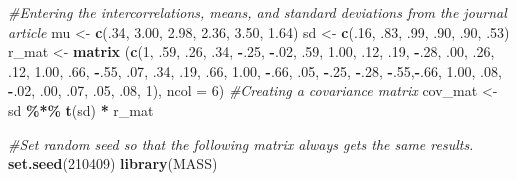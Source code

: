 \documentclass[
  11pt,
]{book}
\newenvironment{Shaded}{\begin{snugshade}}{\end{snugshade}}
\newcommand{\AttributeTok}[1]{\textcolor[rgb]{0.27,0.27,0.27}{#1}}
\newcommand{\CommentTok}[1]{\textcolor[rgb]{0.37,0.37,0.37}{\textit{#1}}}
\newcommand{\DecValTok}[1]{\textcolor[rgb]{0.06,0.06,0.06}{#1}}
\newcommand{\FloatTok}[1]{\textcolor[rgb]{0.06,0.06,0.06}{#1}}
\newcommand{\FunctionTok}[1]{\textcolor[rgb]{0.27,0.27,0.27}{\textbf{#1}}}
\newcommand{\NormalTok}[1]{#1}
\newcommand{\OtherTok}[1]{\textcolor[rgb]{0.37,0.37,0.37}{#1}}
\newcommand{\SpecialCharTok}[1]{\textcolor[rgb]{0.43,0.43,0.43}{\textbf{#1}}}
\begin{document}
\begin{Shaded}
\begin{Highlighting}[]
\CommentTok{\#Entering the intercorrelations, means, and standard deviations from the journal article}
\NormalTok{mu }\OtherTok{\textless{}{-}} \FunctionTok{c}\NormalTok{(.}\DecValTok{34}\NormalTok{, }\FloatTok{3.00}\NormalTok{, }\FloatTok{2.98}\NormalTok{, }\FloatTok{2.36}\NormalTok{, }\FloatTok{3.50}\NormalTok{, }\FloatTok{1.64}\NormalTok{)}
\NormalTok{sd }\OtherTok{\textless{}{-}} \FunctionTok{c}\NormalTok{(.}\DecValTok{16}\NormalTok{, .}\DecValTok{83}\NormalTok{, .}\DecValTok{99}\NormalTok{, .}\DecValTok{90}\NormalTok{, .}\DecValTok{90}\NormalTok{, .}\DecValTok{53}\NormalTok{)}
\NormalTok{r\_mat }\OtherTok{\textless{}{-}} \FunctionTok{matrix}\NormalTok{ (}\FunctionTok{c}\NormalTok{(}\DecValTok{1}\NormalTok{,   .}\DecValTok{59}\NormalTok{, .}\DecValTok{26}\NormalTok{,   .}\DecValTok{34}\NormalTok{,  }\SpecialCharTok{{-}}\NormalTok{.}\DecValTok{25}\NormalTok{, }\SpecialCharTok{{-}}\NormalTok{.}\DecValTok{02}\NormalTok{,}
\NormalTok{                  .}\DecValTok{59}\NormalTok{, }\FloatTok{1.00}\NormalTok{, .}\DecValTok{12}\NormalTok{,   .}\DecValTok{19}\NormalTok{,  }\SpecialCharTok{{-}}\NormalTok{.}\DecValTok{28}\NormalTok{, .}\DecValTok{00}\NormalTok{, }
\NormalTok{                  .}\DecValTok{26}\NormalTok{,  .}\DecValTok{12}\NormalTok{, }\FloatTok{1.00}\NormalTok{, .}\DecValTok{66}\NormalTok{,  }\SpecialCharTok{{-}}\NormalTok{.}\DecValTok{55}\NormalTok{, .}\DecValTok{07}\NormalTok{,}
\NormalTok{                  .}\DecValTok{34}\NormalTok{,  .}\DecValTok{19}\NormalTok{, .}\DecValTok{66}\NormalTok{,  }\FloatTok{1.00}\NormalTok{, }\SpecialCharTok{{-}}\NormalTok{.}\DecValTok{66}\NormalTok{, .}\DecValTok{05}\NormalTok{,}
                 \SpecialCharTok{{-}}\NormalTok{.}\DecValTok{25}\NormalTok{, }\SpecialCharTok{{-}}\NormalTok{.}\DecValTok{28}\NormalTok{, }\SpecialCharTok{{-}}\NormalTok{.}\DecValTok{55}\NormalTok{,}\SpecialCharTok{{-}}\NormalTok{.}\DecValTok{66}\NormalTok{,  }\FloatTok{1.00}\NormalTok{, .}\DecValTok{08}\NormalTok{, }
                 \SpecialCharTok{{-}}\NormalTok{.}\DecValTok{02}\NormalTok{,  .}\DecValTok{00}\NormalTok{,  .}\DecValTok{07}\NormalTok{, .}\DecValTok{05}\NormalTok{, .}\DecValTok{08}\NormalTok{,  }\DecValTok{1}\NormalTok{), }\AttributeTok{ncol =} \DecValTok{6}\NormalTok{)}
\CommentTok{\#Creating a covariance matrix}
\NormalTok{cov\_mat }\OtherTok{\textless{}{-}}\NormalTok{ sd }\SpecialCharTok{\%*\%} \FunctionTok{t}\NormalTok{(sd) }\SpecialCharTok{*}\NormalTok{ r\_mat}

\CommentTok{\#Set random seed so that the following matrix always gets the same results.}
\FunctionTok{set.seed}\NormalTok{(}\DecValTok{210409}\NormalTok{)}
\FunctionTok{library}\NormalTok{(MASS)}
\end{Highlighting}
\end{Shaded}
\end{document}
